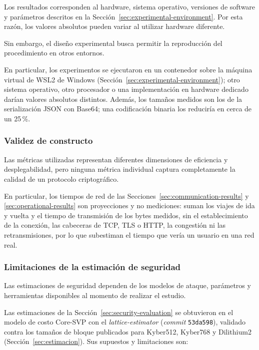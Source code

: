 Los resultados corresponden al hardware, sistema operativo, versiones de software y
parámetros descritos en la Sección~\ref{sec:experimental-environment}. Por esta razón,
los valores absolutos pueden variar al utilizar hardware diferente.

Sin embargo, el diseño experimental busca permitir la reproducción del procedimiento
en otros entornos.

En particular, los experimentos se ejecutaron en un contenedor sobre la máquina virtual de WSL2 de Windows (Sección~\ref{sec:experimental-environment}); otro sistema operativo, otro procesador o una implementación en hardware dedicado darían valores absolutos distintos. Además, los tamaños medidos son los de la serialización JSON con Base64; una codificación binaria los reduciría en cerca de un 25\,\%.


\subsubsection{Validez de constructo}

Las métricas utilizadas representan diferentes dimensiones de eficiencia y
desplegabilidad, pero ninguna métrica individual captura completamente la calidad de
un protocolo criptográfico.

En particular, los tiempos de red de las Secciones~\ref{sec:communication-results} y
\ref{sec:operational-results} son proyecciones y no mediciones: suman los viajes de ida y vuelta y el tiempo de transmisión
de los bytes medidos, sin el establecimiento de la conexión, las cabeceras de TCP, TLS o HTTP, la
congestión ni las retransmisiones, por lo que subestiman el tiempo que vería un usuario
en una red real.


\subsubsection{Limitaciones de la estimación de seguridad}

Las estimaciones de seguridad dependen de los modelos de ataque, parámetros y
herramientas disponibles al momento de realizar el estudio.

Las estimaciones de la Sección~\ref{sec:security-evaluation} se obtuvieron en el modelo de
costo Core-SVP con el \textit{lattice-estimator} (\textit{commit} \texttt{53da598}),
validado contra los tamaños de bloque publicados para Kyber512, Kyber768 y Dilithium2
(Sección~\ref{sec:estimacion}). Sus supuestos y limitaciones son:

